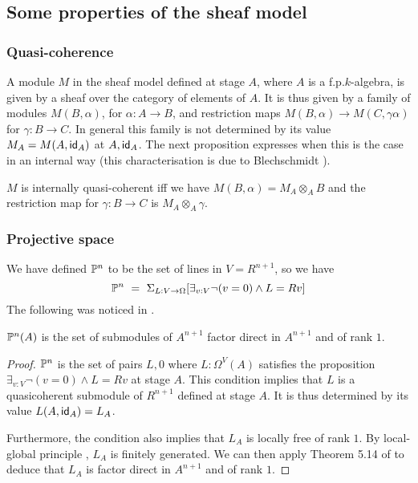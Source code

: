     \subsection{Some properties of the sheaf model}

    \subsubsection{Quasi-coherence}

A module $M$ in the sheaf model defined at stage $A$, where $A$ is a f.p.\@ $k$-algebra, is given by a sheaf over the category
of elements of $A$. It is thus given by a family of modules $M(B,\alpha)$, for $\alpha:A\rightarrow B$, and restriction maps
$M(B,\alpha)\rightarrow M(C,\gamma\alpha)$ for $\gamma:B\rightarrow C$. In general this family is not determined by
its value $M_A = M(A,\mathsf{id}_A)$ at $A,\mathsf{id}_A$. The next proposition expresses when this is the case in an internal way
(this characterisation is due to Blechschmidt \cite{ingo-thesis}).

\begin{proposition}
  $M$ is internally quasi-coherent iff we have $M(B,\alpha) = M_A\otimes_A B$ and the restriction map for
  $\gamma:B\rightarrow C$ is $M_A\otimes_A\gamma$.
\end{proposition}

    \subsubsection{Projective space}

We have defined $\mathbb{P}^n$ to be the set of lines in $V = R^{n+1}$, so we have
$$
\mathbb{P}^n ~=~ \Sigma_{L:V\rightarrow \Omega}[\exists_{v:V}\neg (v = 0)\wedge L = R v]
$$
The following was noticed in \cite{kockreyes}.

\begin{proposition}
  $\mathbb{P}^n(A)$ is the set of submodules of $A^{n+1}$ factor direct in $A^{n+1}$ and of rank $1$.
\end{proposition}

\begin{proof}
  $\mathbb{P}^n$ is the set of pairs $L,0$ where $L:\Omega^V(A)$ satisfies the proposition $\exists_{v:V}\neg (v = 0)\wedge L = Rv$ at stage
  $A$. This condition implies that $L$ is a quasicoherent submodule of $R^{n+1}$ defined at stage $A$.
  It is thus determined by its value $L(A,\mathsf{id}_A) = L_A$.

  Furthermore, the condition also implies that $L_A$ is locally free of rank $1$. By local-global principle \cite{lombardi-quitte},
  $L_A$ is finitely generated. We can then apply Theorem 5.14 of
  \cite{lombardi-quitte} to deduce that $L_A$ is factor direct in $A^{n+1}$ and of rank $1$.
\end{proof}


